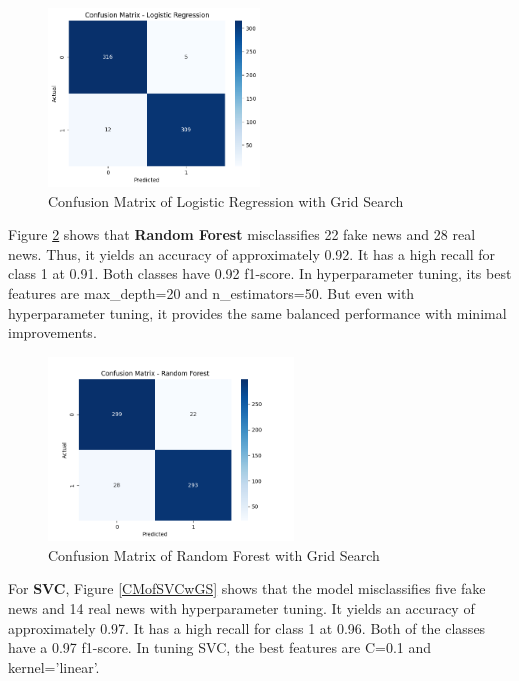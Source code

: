 \begin{figure}[ht]
\centering
\includegraphics[width=0.5\textwidth,height=0.5\textheight, keepaspectratio]{figures/withgridsearch/LR.png}
  \caption{Confusion Matrix of Logistic Regression with Grid Search}
  \label{CMofLRwGS}
\end{figure}

\clearpage

Figure \ref{CMofRFwGS} shows that \textbf{Random Forest} misclassifies 22 fake news and 28 real news. Thus, it yields an accuracy of approximately 0.92. It has a high recall for class 1 at 0.91. Both classes have 0.92 f1-score. In hyperparameter tuning, its best features are max\_depth=20 and n\_estimators=50. But even with hyperparameter tuning, it provides the same balanced performance with minimal improvements.

\begin{figure}[ht]
\centering
\includegraphics[width=0.58\textwidth,height=0.58\textheight, keepaspectratio]{figures/withgridsearch/RF.png}
  \caption{Confusion Matrix of Random Forest with Grid Search}
  \label{CMofRFwGS}
\end{figure}

\clearpage

For \textbf{SVC}, Figure \ref{CMofSVCwGS} shows that the model misclassifies five fake news and 14 real news with hyperparameter tuning. It yields an accuracy of approximately 0.97. It has a high recall for class 1 at 0.96. Both of the classes have a 0.97 f1-score. In tuning SVC, the best features are C=0.1 and kernel='linear'.

